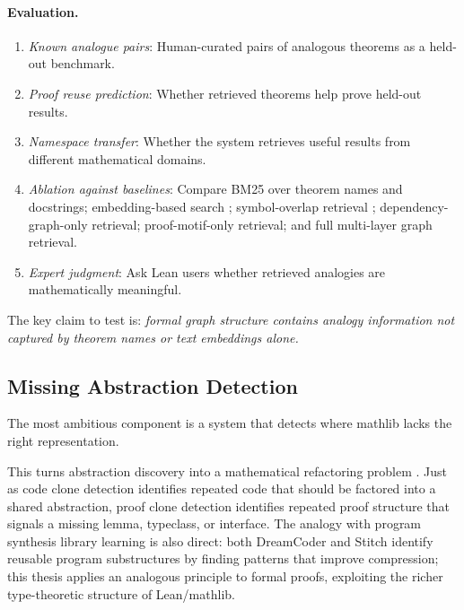 \documentclass[12pt, a4paper]{article}
\begin{document}
\paragraph{Evaluation.}
\begin{enumerate}[leftmargin=1.5em]
  \item \textit{Known analogue pairs}: Human-curated pairs of analogous
        theorems as a held-out benchmark.
  \item \textit{Proof reuse prediction}: Whether retrieved theorems help
        prove held-out results.
  \item \textit{Namespace transfer}: Whether the system retrieves useful
        results from different mathematical domains.
  \item \textit{Ablation against baselines}: Compare BM25 over theorem
        names and docstrings; embedding-based search \citep{gao2024leansearch};
        symbol-overlap retrieval \citep{meng2009mepo}; dependency-graph-only
        retrieval; proof-motif-only retrieval; and full multi-layer graph
        retrieval.
  \item \textit{Expert judgment}: Ask Lean users whether retrieved analogies
        are mathematically meaningful.
\end{enumerate}

The key claim to test is: \textit{formal graph structure contains analogy
information not captured by theorem names or text embeddings alone.}

\subsection{Missing Abstraction Detection}

The most ambitious component is a system that detects where mathlib lacks
the right representation.

This turns abstraction discovery into a mathematical refactoring problem
\citep{roycordy2007}. Just as code clone detection identifies repeated code
that should be factored into a shared abstraction, proof clone detection
identifies repeated proof structure that signals a missing lemma, typeclass,
or interface. The analogy with program synthesis library learning is also
direct: both DreamCoder \citep{ellis2021dreamcoder} and Stitch
\citep{bowers2023stitch} identify reusable program substructures by finding
patterns that improve compression; this thesis applies an analogous principle
to formal proofs, exploiting the richer type-theoretic structure of
Lean/mathlib.
\end{document}
